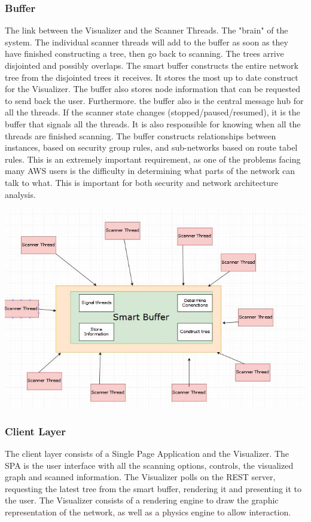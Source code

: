 \documentclass[hidelinks,a4paper,12pt]{article}
\begin{document}
\subsubsection{Buffer}
The link between the Visualizer and the Scanner Threads. The "brain" of the system. The individual scanner threads will add to the buffer as soon as they have finished constructing a tree, then go back to scanning. The trees arrive disjointed and possibly overlaps. The smart buffer constructs the entire network tree from the disjointed trees it receives. It stores the most up to date construct for the Visualizer. The buffer also stores node information that can be requested to send back the user.
\newline
Furthermore. the buffer also is the central message hub for all the threads. If the scanner state changes (stopped/paused/resumed), it is the buffer that signals all the threads. It is also responsible for knowing when all the threads are finished scanning. The buffer constructs relationships between instances, based on security group rules, and sub-networks based on route tabel rules. This is an extremely important requirement, as one of the problems facing many AWS users is the difficulty in determining what parts of the network can talk to what. This is important for both security and network architecture analysis.



\includegraphics[width=1.00\textwidth]{./images/buffer.jpg}\\[0.4cm] 

\subsubsection{Client Layer}
The client layer consists of a Single Page Application and the Visualizer. The SPA is the user interface with all the scanning options, controls, the visualized graph and scanned information. The Visualizer polls on the REST server, requesting the latest tree from the smart buffer, rendering it and presenting it to the user. The Visualizer consists of a rendering engine to draw the graphic representation of the network, as well as a physics engine to allow interaction. 
\end{document}
